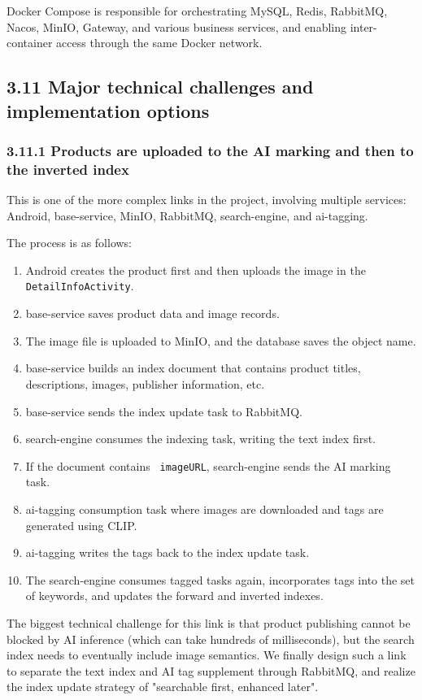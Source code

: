 \documentclass{article}
\begin{document}
Docker Compose is responsible for orchestrating MySQL, Redis, RabbitMQ, Nacos, MinIO, Gateway, and various business services, and enabling inter-container access through the same Docker network.

\subsection{3.11 Major technical challenges and implementation options}

\subsubsection{3.11.1 Products are uploaded to the AI marking and then to the inverted index}

This is one of the more complex links in the project, involving multiple services: Android, base-service, MinIO, RabbitMQ, search-engine, and ai-tagging.

The process is as follows:

\begin{enumerate}
    \item Android creates the product first and then uploads the image in the \texttt{DetailInfoActivity}.
    \item base-service saves product data and image records.
    \item The image file is uploaded to MinIO, and the database saves the object name.
    \item base-service builds an index document that contains product titles, descriptions, images, publisher information, etc.
    \item base-service sends the index update task to RabbitMQ.
    \item search-engine consumes the indexing task, writing the text index first.
    \item If the document contains \texttt{ imageURL}, search-engine sends the AI marking task.
    \item ai-tagging consumption task where images are downloaded and tags are generated using CLIP.
    \item ai-tagging writes the tags back to the index update task.
    \item The search-engine consumes tagged tasks again, incorporates tags into the set of keywords, and updates the forward and inverted indexes.
\end{enumerate}

The biggest technical challenge for this link is that product publishing cannot be blocked by AI inference (which can take hundreds of milliseconds), but the search index needs to eventually include image semantics. We finally design such a link to separate the text index and AI tag supplement through RabbitMQ, and realize the index update strategy of "searchable first, enhanced later".
\end{document}
